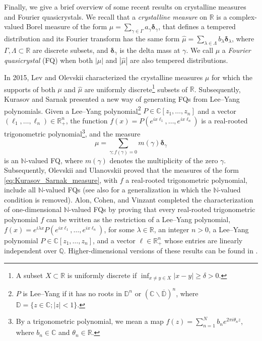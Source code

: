 \documentclass[a4paper,reqno,12pt]{amsart}
\newcommand{\n}{\mathbb{N}}
\newcommand{\q}{\mathbb{Q}}
\renewcommand{\r}{\mathbb{R}}
\newcommand{\cp}{\mathbb{C}} %
\newcommand{\ft}{\widehat}
\newcommand{\bo}{\boldsymbol}
\newcommand{\la}{\lambda}
\newcommand{\ga}{\gamma}
\newcommand{\ov}[1]{\overline{#1}}
\newcommand{\1}{{\bf 1}}
\newcommand{\del}{{\bo \delta}}
\begin{document}
Finally, we give a brief overview of some recent results on crystalline measures and Fourier quasicrystals. We recall that a \textit{crystalline measure} on $\r$ is a complex-valued Borel measure of the form $\mu=\sum_{\ga\in\Gamma} a_\ga\del_\ga$, that defines a tempered distribution and its Fourier transform has the same form $\ft{\mu}=\sum_{\la\in\Lambda} b_\la\del_\la$, where $\Gamma,\Lambda\subset\r$ are discrete subsets, and $\del_\ga$ is the delta mass at $\ga$. We call $\mu$ a \textit{Fourier quasicrystal} (FQ) when both $|\mu|$ and $|\ft{\mu}|$ are also tempered distributions.

In 2015, Lev and Olevskii \cite{LO2} characterized the crystalline measures $\mu$ for which the supports of both $\mu$ and $\ft{\mu}$ are uniformly discrete\footnote{A subset $X\subset\r$ is uniformly discrete if $\inf_{x\neq y\in X} |x-y|\geq\delta>0$.} subsets of $\r$. Subsequently, Kurasov and Sarnak \cite{KS} presented a new way of generating FQs from Lee--Yang polynomials. Given a Lee--Yang polynomial\footnote{$P$ is Lee--Yang if it has no roots in $\mathbb{D}^n$ or $\left(\cp\backslash\ov{\mathbb{D}}\right)^n$, where $\mathbb{D}=\{z\in\cp;|z|<1\}$.} $P\in\cp[z_1,\ldots,z_n]$ and a vector $(\ell_1,\ldots,\ell_n)\in\r_+^n$, the function $f(x)=P(e^{ix\ell_1},\ldots,e^{ix\ell_n})$ is a real-rooted trigonometric polynomial\footnote{By a trigonometric polynomial, we mean a map $f(z)=\sum_{n=1}^{N} b_n e^{2\pi i\theta_nz}$, where $b_n\in\cp$ and $\theta_n\in\r$.}, and the measure
    \begin{equation}
    \label{eq:Kurasov_Sarnak_measure}
        \mu=\sum_{\ga;f(\ga)=0} m(\ga)\del_\ga
    \end{equation}
is an $\n$-valued FQ, where $m(\ga)$ denotes the multiplicity of the zero $\ga$. Subsequently, Olevskii and Ulanovskii \cite{OU} proved that the measures of the form \eqref{eq:Kurasov_Sarnak_measure}, with $f$ a real-rooted trigonometric polynomial, include all $\n$-valued FQs (see also \cite[Theorem 5]{G23} for a generalization in which the $\n$-valued condition is removed). Alon, Cohen, and Vinzant \cite{ACV} completed the characterization of one-dimensional $\n$-valued FQs by proving that every real-rooted trigonometric polynomial $f$ can be written as the restriction of a Lee--Yang polynomial, $f(x)=e^{i\la x}P(e^{ix\ell_1},\ldots,e^{ix\ell_n})$, for some $\la\in\r$, an integer $n>0$, a Lee--Yang polynomial $P\in\cp[z_1,\ldots,z_n]$, and a vector $\bo\ell\in\r_+^n$ whose entries are linearly independent over $\q$. Higher-dimensional versions of these results can be found in \cite{AKKV25,LT25}.
\end{document}

